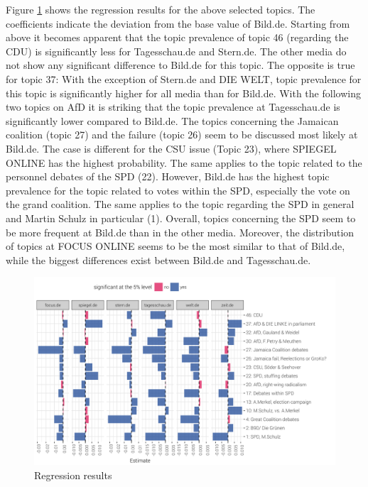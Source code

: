 \documentclass[12pt,a4paper,notitlepage]{article}
\begin{document}
Figure \ref{fig_estimateEffects} shows the regression results for the above selected topics. The coefficients indicate the deviation from the base value of Bild.de. Starting from above it becomes apparent that the topic prevalence of topic 46 (regarding the CDU) is significantly less for Tagesschau.de and Stern.de. The other media do not show any significant difference to Bild.de for this topic. The opposite is true for topic 37: With the exception of Stern.de and DIE WELT, topic prevalence for this topic is significantly higher for all media than for Bild.de. With the following two topics on AfD it is striking that the topic prevalence at Tagesschau.de is significantly lower compared to Bild.de. The topics concerning the Jamaican coalition (topic 27) and the failure (topic 26) seem to be discussed most likely at Bild.de. The case is different for the CSU issue (Topic 23), where SPIEGEL ONLINE has the highest probability. The same applies to the topic related to the personnel debates of the SPD (22). However, Bild.de has the highest topic prevalence for the topic related to votes within the SPD, especially the vote on the grand coalition. The same applies to the topic regarding the SPD in general and Martin Schulz in particular (1). Overall, topics concerning the SPD seem to be more frequent at Bild.de than in the other media. Moreover, the distribution of topics at FOCUS ONLINE seems to be the most similar to that of Bild.de, while the biggest differences exist between Bild.de and Tagesschau.de. 

\begin{figure}[H]
	\caption{Regression results}
		\begin{center}
			\includegraphics[width=\textwidth,keepaspectratio]{../figs/estimates.png}
		\end{center}
	\label{fig_estimateEffects}
\end{figure}
\end{document}
